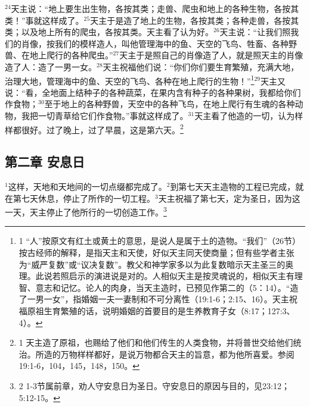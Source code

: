 $^{24}$天主说：“地上要生出生物，各按其类；走兽、爬虫和地上的各种生物，各按其类！”事就这样成了。$^{25}$天主于是造了地上的生物，各按其类；各种走兽，各按其类；以及地上所有的爬虫，各按其类。天主看了认为好。$^{26}$天主说：“让我们照我们的肖像，按我们的模样造人，叫他管理海中的鱼、天空的飞鸟、牲畜、各种野兽、在地上爬行的各种爬虫。”$^{27}$天主于是照自己的肖像造了人，就是照天主的肖像造了人：造了一男一女。$^{28}$天主祝福他们说：“你们你们要生育繁殖，充满大地，治理大地，管理海中的鱼、天空的飞鸟、各种在地上爬行的生物！”\footnote{1 “人”按原文有红土或黄土的意思，是说人是属于土的造物。“我们”（26节）按古\UL[犹太]经师的解释，是指天主和天使，好似天主同天使商量；但有些学者主张为“威严复数”或“议决复数”。教父和神学家多以为此复数暗示天主圣三的奥理。此说若照启示的演进说是对的。人相似天主是按灵魂说的，相似天主有理智、意志和记忆。论人的肉身，当天主造\UL[亚当]时，已预见作\UL[亚当]第二的\UL[基督]（5：14）。“造了一男一女”，指婚姻一夫一妻制和不可分离性（19:1-6；2:15、16）。天主祝福原祖生育繁殖的话，说明婚姻的首要目的是生养教育子女（8:17；127:3、4）。}$^{29}$天主又说：“看，全地面上结种子的各种蔬菜，在果内含有种子的各种果树，我都给你们作食物；$^{30}$至于地上的各种野兽，天空中的各种飞鸟，在地上爬行有生魂的各种动物，我把一切青草给它们作食物。”事就这样成了。$^{31}$天主看了他造的一切，认为样样都很好。过了晚上，过了早晨，这是第六天。\footnote{1 天主造了原祖，也赐给了他们和他们传生的人类食物，并将普世交给他们统治。所造的万物样样都好，是说万物都合天主的旨意，都为他所喜爱。参阅19:1-6，104，145，148，150。}


\subsection{第二章 安息日}
$^{1}$这样，天地和天地间的一切点缀都完成了。$^{2}$到第七天天主造物的工程已完成，就在第七天休息，停止了所作的一切工程。$^{3}$天主祝福了第七天，定为圣日，因为这一天，天主停止了他所行的一切创造工作。\footnote[1]{2 1-3节属前章，劝人守安息日为圣日。守安息日的原因与目的，见23:12；5:12-15。}


